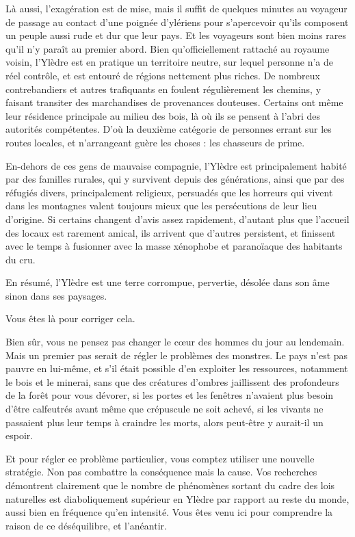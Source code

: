\documentclass{report}
\begin{document}
Là aussi, l'exagération est de mise, mais il suffit de quelques minutes au voyageur de passage au contact d'une poignée d'ylériens pour s'apercevoir qu'ils composent un peuple aussi rude et dur que leur pays. Et les voyageurs sont bien moins rares qu'il n'y paraît au premier abord. Bien qu'officiellement rattaché au royaume voisin, l'Ylèdre est en pratique un territoire neutre, sur lequel personne n'a de réel contrôle, et est entouré de régions nettement plus riches. De nombreux contrebandiers et autres trafiquants en foulent régulièrement les chemins, y faisant transiter des marchandises de provenances douteuses. Certains ont même leur résidence principale au milieu des bois, là où ils se pensent à l'abri des autorités compétentes. D'où la deuxième catégorie de personnes errant sur les routes locales, et n'arrangeant guère les choses : les chasseurs de prime.

En-dehors de ces gens de mauvaise compagnie, l'Ylèdre est principalement habité par des familles rurales, qui y survivent depuis des générations, ainsi que par des réfugiés divers, principalement religieux, persuadés que les horreurs qui vivent dans les montagnes valent toujours mieux que les persécutions de leur lieu d'origine. Si certains changent d'avis assez rapidement, d'autant plus que l'accueil des locaux est rarement amical, ils arrivent que d'autres persistent, et finissent avec le temps à fusionner avec la masse xénophobe et paranoïaque des habitants du cru.

En résumé, l'Ylèdre est une terre corrompue, pervertie, désolée dans son âme sinon dans ses paysages.

Vous êtes là pour corriger cela.

Bien sûr, vous ne pensez pas changer le cœur des hommes du jour au lendemain. Mais un premier pas serait de régler le problèmes des monstres. Le pays n'est pas pauvre en lui-même, et s'il était possible d'en exploiter les ressources, notamment le bois et le minerai, sans que des créatures d'ombres jaillissent des profondeurs de la forêt pour vous dévorer, si les portes et les fenêtres n'avaient plus besoin d'être calfeutrés avant même que crépuscule ne soit achevé, si les vivants ne passaient plus leur temps à craindre les morts, alors peut-être y aurait-il un espoir.

Et pour régler ce problème particulier, vous comptez utiliser une nouvelle stratégie. Non pas combattre la conséquence mais la cause. Vos recherches démontrent clairement que le nombre de phénomènes sortant du cadre des lois naturelles est diaboliquement supérieur en Ylèdre par rapport au reste du monde, aussi bien en fréquence qu'en intensité. Vous êtes venu ici pour comprendre la raison de ce déséquilibre, et l'anéantir.
\end{document}
